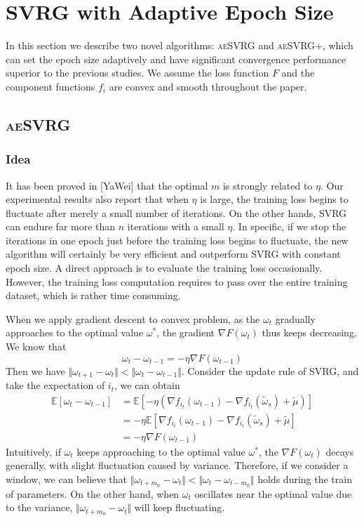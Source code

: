 \documentclass[conference]{IEEEtran}
\begin{document}
 \section{SVRG with Adaptive Epoch Size}
 \label{mywork}
 In this section we describe two novel algorithms: \textsc{aeSVRG} and \textsc{aeSVRG+}, which can set the epoch size adaptively and have significant convergence performance superior to the previous studies.
 We assume the loss function $F$ and the component functions $f_i$ are convex and smooth throughout the paper.
 
 \subsection{\textsc{aeSVRG}}
 \subsubsection{Idea}
 It has been proved in [YaWei] that the optimal $m$ is strongly related to $\eta$. Our experimental results also report that when $\eta$ is large, the training loss begins to fluctuate after merely a small number of iterations. On the other hands, SVRG can endure far more than $n$ iterations with a small $\eta$. In specific, if we stop the iterations in one epoch just before the training loss begins to fluctuate, the new algorithm will certainly be very efficient and outperform SVRG with constant epoch size. A direct approach is to evaluate the training loss occasionally. However, the training loss computation requires to pass over the entire training dataset, which is rather time consuming. 

 When we apply gradient descent to convex problem, as the $\omega_t$ gradually approaches to the optimal value $\omega^*$, the gradient $\nabla F(\omega_t)$ thus keeps decreasing. We know that
 $$\omega_t - \omega_{t-1} = -\eta\nabla F(\omega_{t-1})$$
 Then we have $\Vert\omega_{t+1}-\omega_t\Vert<\Vert\omega_{t}-\omega_{t-1}\Vert$. 
Consider the update rule of SVRG, and take the expectation of $i_t$, we can obtain
 \begin{equation}
\label{sgdinequality}
\begin{split}
\mathbb{E}[\omega_t -\omega_{t-1}] &=  \mathbb{E}[- \eta(\nabla f_{i_t}(\omega_{t-1}) - \nabla f_{i_t}(\tilde{\omega}_s)+\tilde{\mu})]\\
&=-\eta\mathbb{E}[\nabla f_{i_t}(\omega_{t-1}) - \nabla f_{i_t}(\tilde{\omega}_s)+\tilde{\mu}]\\
&=-\eta\nabla F(\omega_{t-1})
\end{split}
\end{equation}
 Intuitively, if $\omega_t$ keeps approaching to the optimal value $\omega^*$, the $\nabla F(\omega_{t})$ decays generally, with slight fluctuation caused by variance. Therefore, if we consider a window, we can believe that $\Vert\omega_{t+m_0}-\omega_t\Vert<\Vert\omega_{t}-\omega_{t-m_0}\Vert$ holds  during the train of parameters.  
 On the other hand, when $\omega_t$ oscillates near the optimal value due to the variance, $\Vert\omega_{t+m_0}-\omega_t\Vert$ will keep fluctuating. 
\end{document}
